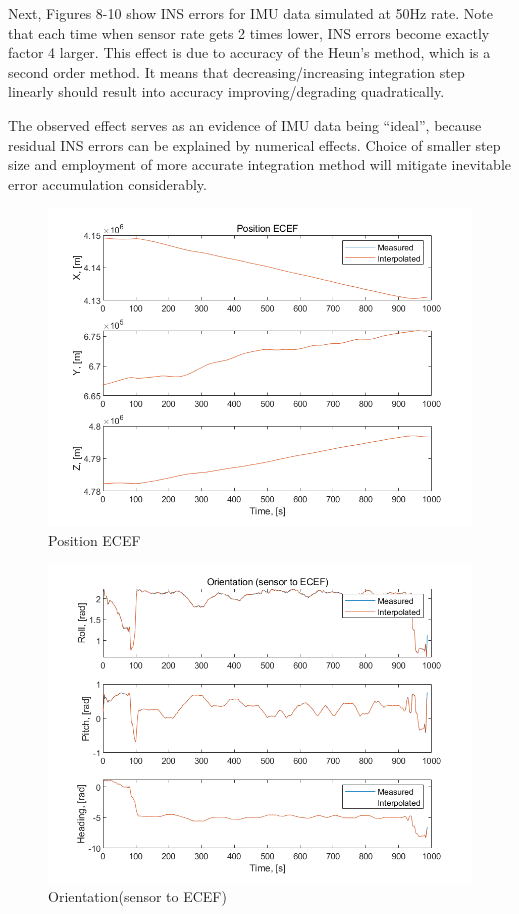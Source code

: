 \documentclass[conference]{IEEEtran}
\begin{document}
Next, Figures 8-10 show INS errors for IMU data simulated at 50Hz rate. Note that each time when sensor rate gets 2 times lower, INS errors become exactly factor 4 larger. This effect is due to accuracy of the Heun’s method, which is a second order method. It means that decreasing/increasing integration step linearly should result into accuracy improving/degrading quadratically.

The observed effect serves as an evidence of IMU data being “ideal”, because residual INS errors can be explained by numerical effects. Choice of smaller step size and employment of more accurate integration method will mitigate inevitable error accumulation considerably.

\begin{figure}[htbp]
    \centerline{\includegraphics[width=1.0\columnwidth]{fig1.png}}
    \caption{Position ECEF}
\end{figure}

\begin{figure}[htbp]
    \centerline{\includegraphics[width=1.0\columnwidth]{fig2.png}}
    \caption{Orientation(sensor to ECEF)}
\end{figure}
\end{document}
